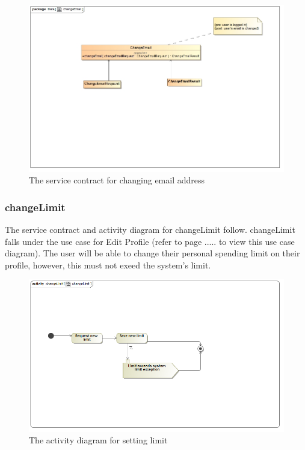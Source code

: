 \documentclass[a4paper,12pt]{article}
\begin{document}
\begin{figure}[H]
	\centering
	\includegraphics[width=1.0\textwidth]{images/changeEmailSC.jpg}
	\caption{The service contract for changing email address}
\end{figure}

\subsubsection{changeLimit}
The service contract and activity diagram for changeLimit follow. changeLimit falls under the use case for Edit Profile (refer to page ..... to view this use case diagram). The user will be able to change their personal spending limit on their profile, however, this must not exeed the system's limit.
\begin{figure}[H]
  \centering
    \includegraphics[width=1.0\textwidth]{images/changeLimit.png}
    \caption{The activity diagram for setting limit} 
\end{figure}
\end{document}
